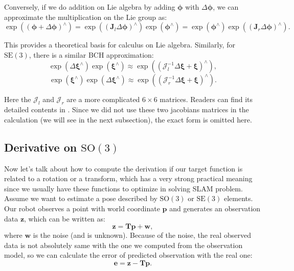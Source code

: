 Conversely, if we do addition on Lie algebra by adding $\boldsymbol{\phi}$ with $\Delta \boldsymbol{\phi}$, we can approximate the multiplication on the Lie group as:
\begin{equation}
\exp \left( {{{\left( { \boldsymbol{\phi} + \Delta \boldsymbol{\phi} } \right)}^ \wedge }} \right) = \exp \left( {{{\left( {{ \mathbf{J}_l}\Delta \boldsymbol{\phi} } \right)}^ \wedge }} \right)\exp \left( {{ \boldsymbol{\phi} ^ \wedge }} \right) = \exp \left( {{\boldsymbol{\phi} ^ \wedge }} \right)\exp \left( {{{\left( {{\mathbf{J}_r}\Delta \boldsymbol{ \phi} } \right)}^ \wedge }} \right).
\end{equation}

This provides a theoretical basis for calculus on Lie algebra. Similarly, for $\mathrm{SE}(3)$, there is a similar BCH approximation:
\begin{equation}
\exp \left( {\Delta {\boldsymbol{\xi} ^ \wedge }} \right)\exp \left( {{ \boldsymbol{\xi} ^ \wedge }} \right) \approx \exp \left ( {{{\left( {{ \boldsymbol{\mathcal{J}}_l^{-1} }\Delta \boldsymbol{\xi} + \boldsymbol{\xi} } \right)}^ \wedge }} \right),
\end{equation}
\begin{equation}
\exp \left( {{ \boldsymbol{\xi} ^ \wedge }} \right) \exp \left( {\Delta {\boldsymbol{\xi} ^ \wedge }} \right) \approx \exp \left ( {{{\left( {{ \boldsymbol{\mathcal{J}}_r^{-1} }\Delta \boldsymbol{\xi} + \boldsymbol{\xi} } \right)}^ \wedge }} \right).
\end{equation}

Here the $\boldsymbol{\mathcal{J}}_l$ and $\boldsymbol{\mathcal{J}}_r$ are a more complicated $6 \times 6$ matrices. Readers can find its detailed contents in \cite{Barfoot2016}. Since we did not use these two jacobians matrices in the calculation (we will see in the next subsection), the exact form is omitted here.

\subsection{Derivative on $\mathrm{SO}(3)$}
Now let's talk about how to compute the derivation if our target function is related to a rotation or a transform, which has a very strong practical meaning since we usually have these functions to optimize in solving SLAM problem. Assume we want to estimate a pose described by $\mathrm{SO}(3)$ or $\mathrm{SE}(3)$ elements. Our robot observes a point with world coordinate $\mathbf{p}$ and generates an observation data $\mathbf{z}$, which can be written as:
\begin{equation}
\mathbf{z} = \mathbf{T} \mathbf{p} + \mathbf{w},
\end{equation}
where $\mathbf{w}$ is the noise (and is unknown). Because of the noise, the real observed data is not absolutely same with the one we computed from the observation model, so we can calculate the error of predicted observation with the real one: 
\begin{equation}
\mathbf{e} = \mathbf{z} - \mathbf{T} \mathbf{p}.
\end{equation}

